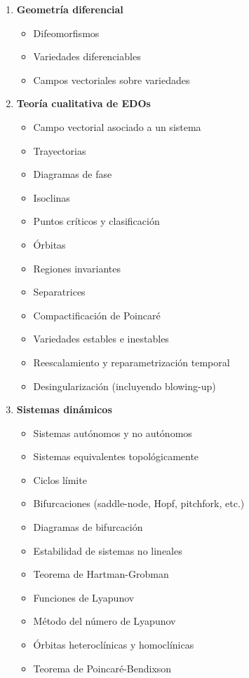 \begin{enumerate}
	\item \textbf{Geometría diferencial}
	\begin{itemize}
		\item Difeomorfismos
		\item Variedades diferenciables
		\item Campos vectoriales sobre variedades
	\end{itemize}
	
	\item \textbf{Teoría cualitativa de EDOs}
	\begin{itemize}
		\item Campo vectorial asociado a un sistema \checkmark
		\item Trayectorias \checkmark
		\item Diagramas de fase \checkmark
		\item Isoclinas \checkmark
		\item Puntos críticos y clasificación \checkmark
		\item Órbitas
		\item Regiones invariantes
		\item Separatrices
		\item Compactificación de Poincaré
		\item Variedades estables e inestables
		\item Reescalamiento y reparametrización temporal
		\item Desingularización (incluyendo blowing-up)
	\end{itemize}
	
	\item \textbf{Sistemas dinámicos}
	\begin{itemize}
		\item Sistemas autónomos y no autónomos \checkmark
		\item Sistemas equivalentes topológicamente
		\item Ciclos límite
		\item Bifurcaciones (saddle-node, Hopf, pitchfork, etc.)
		\item Diagramas de bifurcación
		\item Estabilidad de sistemas no lineales
		\item Teorema de Hartman-Grobman
		\item Funciones de Lyapunov
		\item Método del número de Lyapunov
		\item Órbitas heteroclínicas y homoclínicas
		\item Teorema de Poincaré-Bendixson
	\end{itemize}
	

\end{enumerate}
